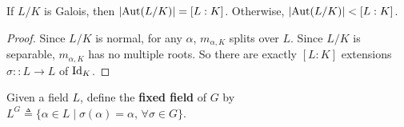\begin{theorem}
  If $L/K$ is Galois, then $\lvert\operatorname{Aut}(L/K)\rvert = [L:K]$. Otherwise, $\lvert\operatorname{Aut}(L/K)\rvert < [L:K]$.

  \begin{proof}
    Since $L/K$ is normal, for any $\alpha$, $m_{\alpha, K}$ splits over $L$.
    Since $L/K$ is separable, $m_{\alpha, K}$ has no multiple roots. So there are exactly $[L:K]$
    extensions $\sigma:: L \to L$ of ${\rm Id}_K$.
  \end{proof}
\end{theorem}

\begin{definition}
  Given a field $L$, define the {\bf fixed field} of $G$ by
  $L^G \triangleq \{ \alpha \in L \mid \sigma(\alpha) = \alpha, \, \forall \sigma \in G \}$.
\end{definition}

